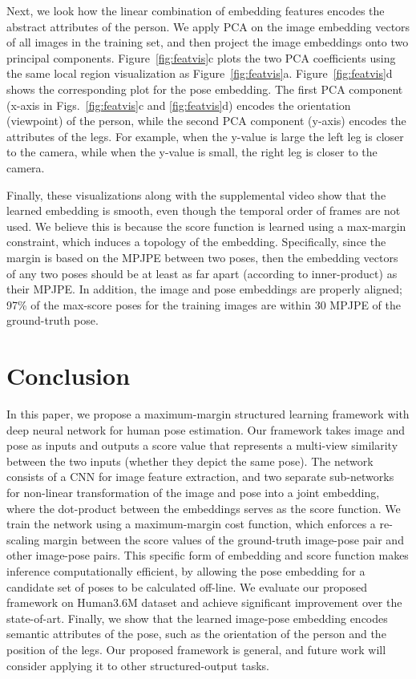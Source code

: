 \documentclass[10pt,twocolumn,letterpaper]{article}
\begin{document}
Next, we look how the linear combination of embedding features encodes the abstract attributes of the person.
We apply PCA on the image embedding vectors of all images in the training set, and then project the image embeddings onto two principal components.
Figure~\ref{fig:featvis}c plots the two PCA coefficients using the same local region visualization as Figure~\ref{fig:featvis}a.  Figure~\ref{fig:featvis}d shows the corresponding plot for the pose embedding.
The first PCA component (x-axis in Figs.~\ref{fig:featvis}c and \ref{fig:featvis}d) encodes the orientation (viewpoint) of the person, while 
the second PCA component (y-axis) encodes the attributes of the legs.  
For example, when the y-value is large the left leg is closer to the camera, while when the y-value is small, the right leg is closer to the camera.

Finally, these visualizations along with the supplemental video show that the learned embedding is smooth, even though the temporal order of frames are not used. We believe this is because the score function is learned using a max-margin constraint, which induces a topology of the embedding. Specifically, since the margin is based on the MPJPE between two poses, then the embedding vectors of any two poses should be at least as far apart (according to inner-product) as their MPJPE.
In addition, the  image and pose embeddings are properly aligned; 97\% of the max-score poses for the training images are within 30 MPJPE of the ground-truth pose.





  
\section{Conclusion}
\vspace{-0.1in}
In this paper, we propose a maximum-margin structured learning framework with deep neural network for human pose estimation. 
Our framework takes image and pose as inputs and outputs a score value that represents a multi-view similarity between the two inputs (whether they depict  the same pose).
The network consists of a CNN for image feature extraction, and two separate sub-networks for non-linear transformation of the image and pose into a joint embedding, where the dot-product between the embeddings  serves as the score function.
We train the network using a maximum-margin cost function, which enforces a re-scaling margin between the score values of the ground-truth image-pose pair and other image-pose pairs.
This specific form of embedding and score function makes inference computationally efficient, by allowing the pose embedding for a candidate set of poses to be calculated off-line.
We evaluate our proposed framework on Human3.6M dataset and achieve significant improvement over the state-of-art.
Finally, we show that the learned image-pose embedding encodes semantic attributes of the pose, such as the orientation of the person and the position of the legs.
Our proposed framework is general, and future work will consider applying it to other structured-output tasks.
 
 
   

{\small


} 
 
\end{document}
